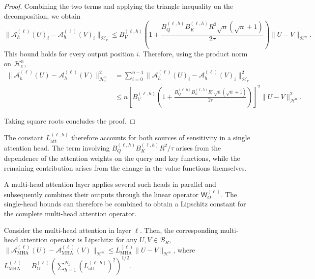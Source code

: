 \begin{proof}
Combining the two terms and applying the triangle inequality on the decomposition, we obtain
\[
\|\mathcal A_h^{(\ell)}(U)_i-\mathcal A_h^{(\ell)}(V)_i\|_{\mathcal H_v}
\leqslant
B_V^{(\ell,h)}
\left(
1+
\frac{
B_Q^{(\ell,h)}
B_K^{(\ell,h)}
R^2
\sqrt n(\sqrt n+1)
}{
2\tau
}
\right)
\|U-V\|_{\mathcal H^n}.
\]
This bound holds for every output position \(i\). Therefore, using the product norm on \(\mathcal H_v^n\),
\[
\begin{aligned}
\|\mathcal A_h^{(\ell)}(U)-\mathcal A_h^{(\ell)}(V)\|_{\mathcal H_v^n}^2
&=
\sum_{i=0}^{n-1}
\|\mathcal A_h^{(\ell)}(U)_i-\mathcal A_h^{(\ell)}(V)_i\|_{\mathcal H_v}^2\\
&\leqslant
n
\left[
B_V^{(\ell,h)}
\left(
1+
\frac{
B_Q^{(\ell,h)}
B_K^{(\ell,h)}
R^2
\sqrt n(\sqrt n+1)
}{
2\tau
}
\right)
\right]^2
\|U-V\|_{\mathcal H^n}^2.
\end{aligned}
\]

Taking square roots concludes the proof.
\end{proof}

The constant \(L_{\mathrm{att}}^{(\ell,h)}\) therefore accounts for both sources of sensitivity in a single attention head. The term involving \(B_Q^{(\ell,h)}B_K^{(\ell,h)}R^2/\tau\) arises from the dependence of the attention weights on the query and key functions, while the remaining contribution arises from the change in the value functions themselves.

A multi-head attention layer applies several such heads in parallel and subsequently combines their outputs through the linear operator \(\mathsf W_O^{(\ell)}\). The single-head bounds can therefore be combined to obtain a Lipschitz constant for the complete multi-head attention operator.

\begin{corollary}
\label{cor:Lipschitz continuity of multi-head attention}
Consider the multi-head attention in layer \(\ell\). Then, the corresponding multi-head attention operator is Lipschitz: for any \(U,V \in \mathcal B_R\), \(\|\mathcal A_{\mathrm{MHA}}^{(\ell)}(U)-\mathcal A_{\mathrm{MHA}}^{(\ell)}(V)\|_{\mathcal H^n}\leqslant L_{\mathrm{MHA}}^{(\ell)}\|U-V\|_{\mathcal H^n}\), where \(L_{\mathrm{MHA}}^{(\ell)}=B_O^{(\ell)}\left(\sum_{h=1}^{N_h}(L_{\mathrm{att}}^{(\ell,h)})^2\right)^{1/2}\).
\end{corollary}

